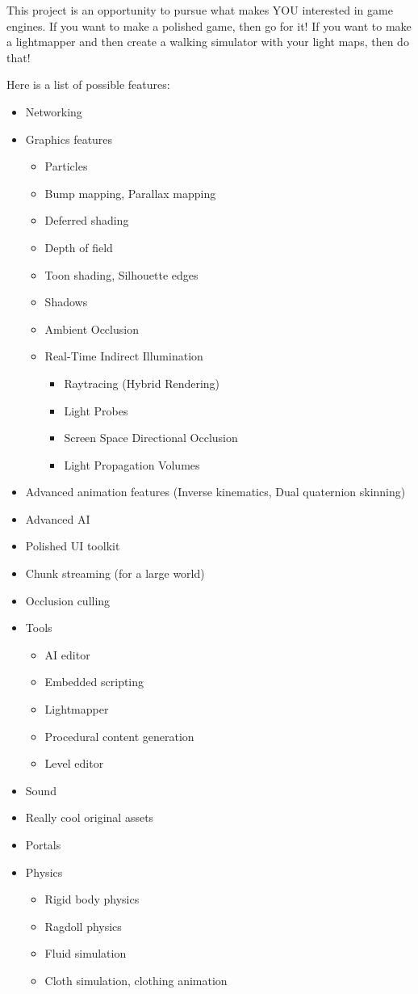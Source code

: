 \documentclass{../cs195u}
\begin{document}
This project is an opportunity to pursue what makes YOU interested in game engines. If you want to make a polished game, then go for it! If you want to make a lightmapper and then create a walking simulator with your light maps, then do that!
 
Here is a list of possible features:
 
 \begin{itemize}
  \item Networking 
  \item Graphics features
  	\begin{itemize} 
	\item Particles 
	\item Bump mapping, Parallax mapping
	\item Deferred shading
	\item Depth of field
	\item Toon shading, Silhouette edges
	\item Shadows
	\item Ambient Occlusion
	\item Real-Time Indirect Illumination
		\begin{itemize}
		\item Raytracing (Hybrid Rendering)
		\item Light Probes 
		\item Screen Space Directional Occlusion 
		\item Light Propagation Volumes
		\end{itemize}
	\end{itemize}
  \item Advanced animation features (Inverse kinematics, Dual quaternion skinning)
  \item Advanced AI 
  \item Polished UI toolkit
  \item Chunk streaming (for a large world)
  \item Occlusion culling
  \item Tools
  	\begin{itemize} 
	\item AI editor
	\item Embedded scripting
	\item Lightmapper
	\item Procedural content generation
	\item Level editor
	\end{itemize}
  \item Sound 
  \item Really cool original assets 
  \item Portals 
  \item Physics
  	\begin{itemize}
   	 \item Rigid body physics
	 \item Ragdoll physics
   	 \item Fluid simulation
	 \item Cloth simulation, clothing animation
	 \end{itemize}
  \end{itemize}
\end{document}
